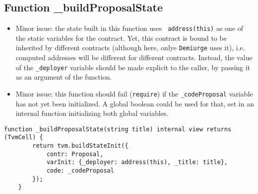 \subsection{Function \_{}buildProposalState}

\begin{itemize}
\item Minor issue: the state built in this function uses {\tt
  address(this)} as one of the static variables for the contract. Yet,
  this contract is bound to be inherited by different contracts
  (although here, onlye {\tt Demiurge} uses it), i.e. computed
  addresses will be different for different contracts. Instead, the
  value of the {\tt \_deployer} variable should be made explicit to
  the caller, by passing it as an argument of the function.
\item Minor issue: this function should fail ({\tt require}) if the
  {\tt \_codeProposal} variable has not yet been initialized. A global
  boolean could be used for that, set in an internal function
  initializing both global variables.
\end{itemize}

\begin{lstlisting}[firstnumber=14]
    function _buildProposalState(string title) internal view returns (TvmCell) {
        return tvm.buildStateInit({
            contr: Proposal,
            varInit: {_deployer: address(this), _title: title},
            code: _codeProposal
        });
    }
\end{lstlisting}
